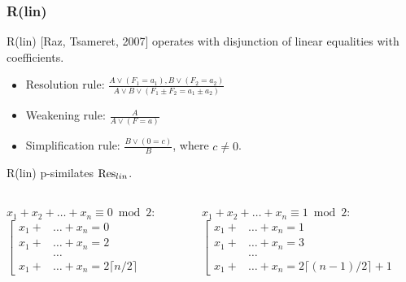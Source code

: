 \begin{frame}
    \frametitle{R(lin)}

    R(lin) [Raz, Tsameret, 2007] operates with disjunction of linear equalities with
     coefficients.
    
	\begin{itemize}
		\item Resolution rule: $\frac{A \lor (F_1 = a_1), B \lor (F_2 = a_2)}
    		{A \lor B \lor (F_1 \pm F_2 = a_1 \pm a_2)}$
		\item Weakening rule: $\frac{A}{A \lor (F = a)}$
		\item Simplification rule: $\frac{B \lor (0 = c)}{B}$, where $c \neq 0$. 
	\end{itemize}

	\pause
    \begin{theorem}
    	R(lin) p-similates $\mathrm{Res}_{lin}$.    
    \end{theorem}
    
	\medskip

	\pause
	\begin{columns}
		\begin{column}{5cm}
			$x_1 + x_2 + \dots + x_n \equiv 0 \bmod 2$:
			$\left[\begin{aligned}
            	x_1 + &\dots + x_n = 0\\
                x_1 + &\dots + x_n = 2\\
                &\dots \\
                x_1 + &\dots + x_n = 2 \lceil n / 2 \rceil
            \end{aligned}\right.$ 
		\end{column}
		\begin{column}{5cm}
			$x_1 + x_2 + \dots + x_n \equiv 1 \bmod 2$:
			$\left[\begin{aligned}
                x_1 + &\dots + x_n = 1\\
                x_1 + &\dots + x_n = 3\\
                &\dots \\
                x_1 + &\dots + x_n = 2 \lceil (n - 1) / 2 \rceil + 1
            \end{aligned}\right.$
		\end{column}
	\end{columns}
\end{frame}


